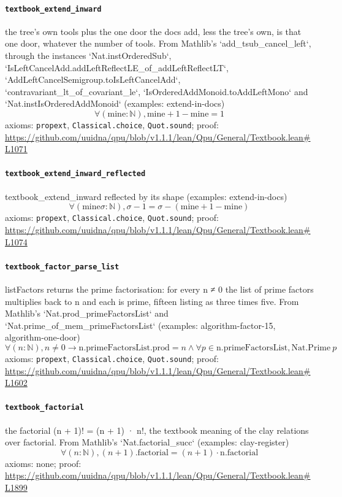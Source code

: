 \documentclass[11pt]{article}
\begin{document}
\paragraph{\texttt{textbook\_extend\_inward}}
the tree's own tools plus the one door the docs add, less the tree's own, is that one door, whatever the number of tools. From Mathlib's `add\_tsub\_cancel\_left`, through the instances `Nat.instOrderedSub`, `IsLeftCancelAdd.addLeftReflectLE\_of\_addLeftReflectLT`, `AddLeftCancelSemigroup.toIsLeftCancelAdd`, `contravariant\_lt\_of\_covariant\_le`, `IsOrderedAddMonoid.toAddLeftMono` and `Nat.instIsOrderedAddMonoid` (examples: extend-in-docs)
\[ \forall (\mathrm{mine} : \mathbb{N}), \mathrm{mine} + 1 - \mathrm{mine} = 1 \]
\noindent axioms: \texttt{propext}, \texttt{Classical.choice}, \texttt{Quot.sound}; proof: \url{https://github.com/uuidna/qpu/blob/v1.1.1/lean/Qpu/General/Textbook.lean\#L1071}

\paragraph{\texttt{textbook\_extend\_inward\_reflected}}
textbook\_extend\_inward reflected by its shape (examples: extend-in-docs)
\[ \forall (\mathrm{mine} \sigma : \mathbb{N}), \sigma - 1 = \sigma - (\mathrm{mine} + 1 - \mathrm{mine}) \]
\noindent axioms: \texttt{propext}, \texttt{Classical.choice}, \texttt{Quot.sound}; proof: \url{https://github.com/uuidna/qpu/blob/v1.1.1/lean/Qpu/General/Textbook.lean\#L1074}

\paragraph{\texttt{textbook\_factor\_parse\_list}}
listFactors returns the prime factorisation: for every n ≠ 0 the list of prime factors multiplies back to n and each is prime, fifteen listing as three times five. From Mathlib's `Nat.prod\_primeFactorsList` and `Nat.prime\_of\_mem\_primeFactorsList` (examples: algorithm-factor-15, algorithm-one-door)
\[ \forall (n : \mathbb{N}), n \ne 0 \to \mathrm{n.primeFactorsList.prod} = n \land \forall p \in \mathrm{n.primeFactorsList}, \mathrm{Nat.Prime}\ p \]
\noindent axioms: \texttt{propext}, \texttt{Classical.choice}, \texttt{Quot.sound}; proof: \url{https://github.com/uuidna/qpu/blob/v1.1.1/lean/Qpu/General/Textbook.lean\#L1602}

\paragraph{\texttt{textbook\_factorial}}
the factorial (n + 1)! = (n + 1) · n!, the textbook meaning of the clay relations over factorial. From Mathlib's `Nat.factorial\_succ` (examples: clay-register)
\[ \forall (n : \mathbb{N}), (n + 1)\mathrm{.factorial} = (n + 1) \cdot \mathrm{n.factorial} \]
\noindent axioms: none; proof: \url{https://github.com/uuidna/qpu/blob/v1.1.1/lean/Qpu/General/Textbook.lean\#L1899}
\end{document}

